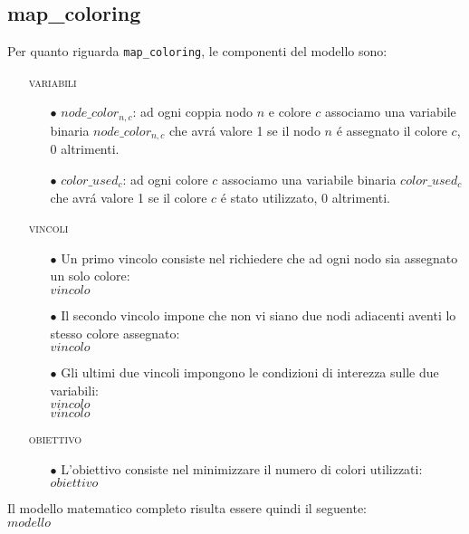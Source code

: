 \documentclass{article}
\begin{document}
\subsection{map\_coloring}
Per quanto riguarda \texttt{map\_coloring}, le componenti del modello sono:\\

\begin{itemize}
\item[] \textsc{variabili}
	\begin{itemize}
	\item[$\bullet$] $node\_color_{n,c}$: ad ogni coppia nodo $n$ e colore $c$ associamo una variabile binaria $node\_color_{n,c}$ che avr\'a valore 1 se il nodo $n$ \'e assegnato il colore $c$, 0 altrimenti.\\
	\item[$\bullet$] $color\_used_{c}$: ad ogni colore $c$ associamo una variabile binaria $color\_used_{c}$ che avr\'a valore 1 se il colore $c$ \'e stato utilizzato, 0 altrimenti.\\
	\end{itemize}
	
\item[] \textsc{vincoli}
	\begin{itemize}
	\item[$\bullet$] Un primo vincolo consiste nel richiedere che ad ogni nodo sia assegnato un solo colore:\\
	$vincolo$
	
	\item[$\bullet$] Il secondo vincolo impone che non vi siano due nodi adiacenti aventi lo stesso colore assegnato:\\
	$vincolo$
	
	\item[$\bullet$] Gli ultimi due vincoli impongono le condizioni di interezza sulle due variabili:\\
	$vincolo$\\
	$vincolo$
	\end{itemize}


\item[] \textsc{obiettivo} 
	\begin{itemize}
	\item[$\bullet$] L'obiettivo consiste nel minimizzare il numero di colori utilizzati:\\
	$obiettivo$
	\end{itemize}
\end{itemize}

Il modello matematico completo risulta essere quindi il seguente:\\
$modello$\\
\end{document}
